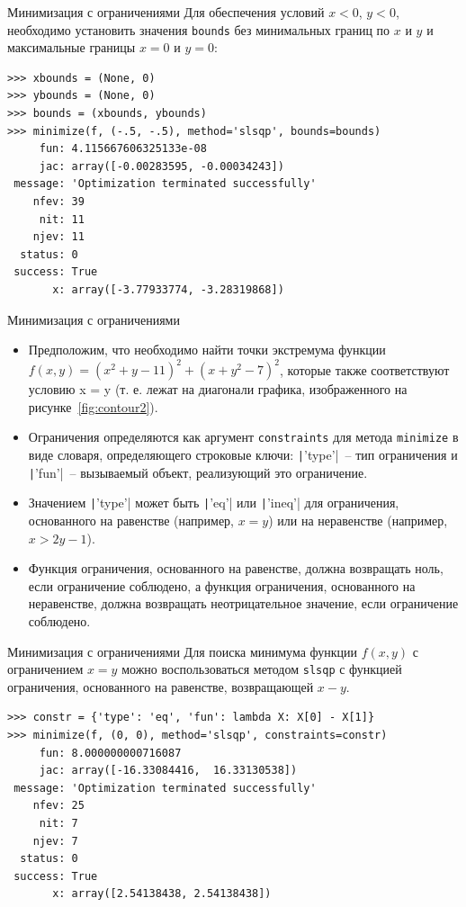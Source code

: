 \documentclass[aspectratio=169, mathserif]{beamer}	%
\begin{document}
\begin{frame}[fragile]{Минимизация с ограничениями}
\scriptsize
Для обеспечения условий $x < 0$, $y < 0$, необходимо установить значения \texttt{bounds} без минимальных границ по $x$ и $y$ и максимальные границы $x = 0$ и $y = 0$:
\vfill
\begin{verbatim}
>>> xbounds = (None, 0)
>>> ybounds = (None, 0)
>>> bounds = (xbounds, ybounds)
>>> minimize(f, (-.5, -.5), method='slsqp', bounds=bounds)
     fun: 4.115667606325133e-08
     jac: array([-0.00283595, -0.00034243])
 message: 'Optimization terminated successfully'
    nfev: 39
     nit: 11
    njev: 11
  status: 0
 success: True
       x: array([-3.77933774, -3.28319868])
\end{verbatim}
\vfill
\end{frame}


\begin{frame}[fragile]{Минимизация с ограничениями}
\scriptsize
\begin{itemize}
\item Предположим, что необходимо найти точки экстремума функции $f\left(x, y\right) = \left(x^2 + y - 11\right)^2 + \left(x + y^2 - 7\right)^2$, которые также соответствуют условию x = y (т. е. лежат на диагонали графика, изображенного на рисунке~\ref{fig:contour2}).
\item Ограничения определяются как аргумент \texttt{constraints} для метода \texttt{minimize} в виде словаря, определяющего строковые ключи: \texttt|'type'|~-- тип ограничения и \texttt|'fun'|~-- вызываемый объект, реализующий это ограничение.
\item Значением \texttt|'type'| может быть \texttt|'eq'| или \texttt|'ineq'| для ограничения, основанного на равенстве (например, $x = y$) или на неравенстве (например, $x > 2y - 1$).
\item Функция ограничения, основанного на равенстве, должна возвращать ноль, если ограничение соблюдено, а функция ограничения, основанного на неравенстве, должна возвращать неотрицательное значение, если ограничение соблюдено.
\end{itemize}
\vfill
\end{frame}


\begin{frame}[fragile]{Минимизация с ограничениями}
\scriptsize
Для поиска минимума функции $f(x, y)$ с ограничением $x = y$ можно воспользоваться методом \texttt{slsqp} с функцией ограничения, основанного на равенстве, возвращающей $x - y$.
\vfill
\begin{verbatim}
>>> constr = {'type': 'eq', 'fun': lambda X: X[0] - X[1]}
>>> minimize(f, (0, 0), method='slsqp', constraints=constr)
     fun: 8.000000000716087
     jac: array([-16.33084416,  16.33130538])
 message: 'Optimization terminated successfully'
    nfev: 25
     nit: 7
    njev: 7
  status: 0
 success: True
       x: array([2.54138438, 2.54138438])
\end{verbatim}
\vfill
\end{frame}
\end{document}

